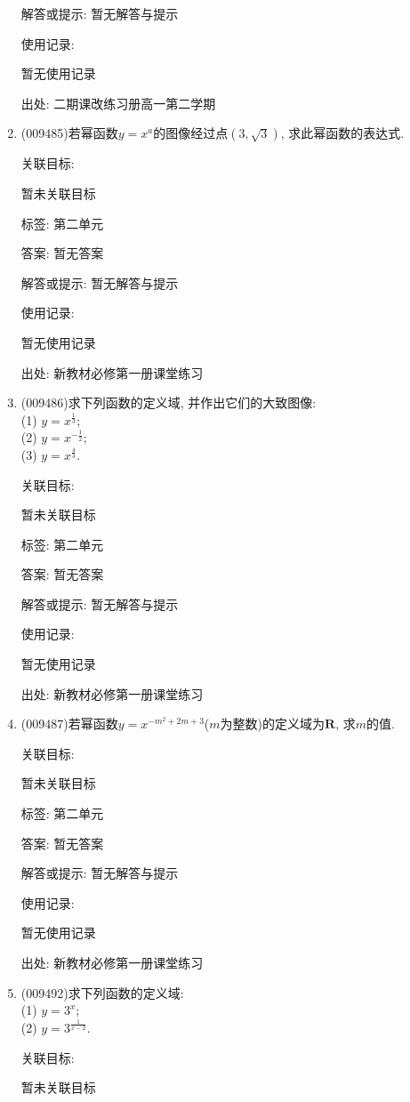 \documentclass[10pt,a4paper]{article}
\begin{document}
\begin{enumerate}[1.]
解答或提示: 暂无解答与提示

使用记录:

暂无使用记录


出处: 二期课改练习册高一第二学期
\item { (009485)}若幂函数$y=x^a$的图像经过点$(3, \sqrt 3)$, 求此幂函数的表达式.


关联目标:

暂未关联目标



标签: 第二单元

答案: 暂无答案

解答或提示: 暂无解答与提示

使用记录:

暂无使用记录


出处: 新教材必修第一册课堂练习
\item { (009486)}求下列函数的定义域, 并作出它们的大致图像:\\
(1) $y=x^{\frac 13}$;\\
(2) $y=x^{-\frac 12}$;\\
(3) $y=x^{\frac 43}$.


关联目标:

暂未关联目标



标签: 第二单元

答案: 暂无答案

解答或提示: 暂无解答与提示

使用记录:

暂无使用记录


出处: 新教材必修第一册课堂练习
\item { (009487)}若幂函数$y=x^{-m^2+2m+3}$($m$为整数)的定义域为$\mathbf{R}$, 求$m$的值.


关联目标:

暂未关联目标



标签: 第二单元

答案: 暂无答案

解答或提示: 暂无解答与提示

使用记录:

暂无使用记录


出处: 新教材必修第一册课堂练习
\item { (009492)}求下列函数的定义域:\\
(1) $y=3^x$;\\
(2) $y=3^{\frac 1{x-2}}$.


关联目标:

暂未关联目标




\end{enumerate}
\end{document}
